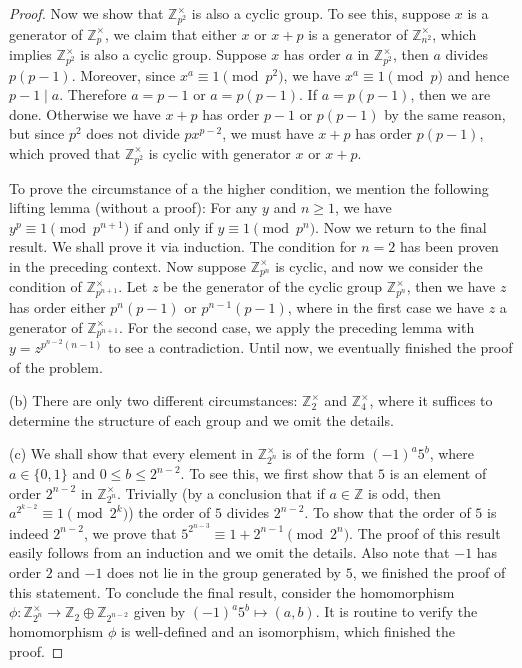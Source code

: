 \begin{proof}
Now we show that $\mathbb{Z}_{p^2}^\times$ is also a cyclic group. To see this, suppose $x$ is a generator of $\mathbb{Z}_p^\times$, we claim that either $x$ or $x+p$ is a generator of $\mathbb{Z}_{n^2}^\times$, which implies $\mathbb{Z}_{p^2}^\times$ is also a cyclic group. Suppose $x$ has order $a$ in $\mathbb{Z}_{p^2}^\times$, then $a$ divides $p(p-1)$. Moreover, since $x^a\equiv 1\pmod{p^2}$, we have $x^a\equiv 1\pmod{p}$ and hence $p-1\mid a$. Therefore $a=p-1$ or $a=p(p-1)$. If $a=p(p-1)$, then we are done. Otherwise we have $x+p$ has order $p-1$ or $p(p-1)$ by the same reason, but since $p^2$ does not divide $px^{p-2}$, we must have $x+p$ has order $p(p-1)$, which proved that $\mathbb{Z}_{p^2}^\times$ is cyclic with generator $x$ or $x+p$.\par
To prove the circumstance of a the higher condition, we mention the following lifting lemma (without a proof): For any $y$ and $n\ge 1$, we have $y^p\equiv 1\pmod{p^{n+1}}$ if and only if $y\equiv 1\pmod{p^n}$. Now we return to the final result. We shall prove it via induction. The condition for $n=2$ has been proven in the preceding context. Now suppose $\mathbb{Z}_{p^n}^\times$ is cyclic, and now we consider the condition of $\mathbb{Z}_{p^{n+1}}^\times$. Let $z$ be the generator of the cyclic group $\mathbb{Z}_{p^n}^\times$, then we have $z$ has order either $p^n(p-1)$ or $p^{n-1}(p-1)$, where in the first case we have $z$ a generator of $\mathbb{Z}_{p^{n+1}}^\times$. For the second case, we apply the preceding lemma with $y=z^{p^{n-2}(n-1)}$ to see a contradiction. Until now, we eventually finished the proof of the problem.\par
(b) There are only two different circumstances: $\mathbb{Z}_2^\times$ and $\mathbb{Z}_4^\times$, where it suffices to determine the structure of each group and we omit the details.\par
(c) We shall show that every element in $\mathbb{Z}_{2^n}^\times$ is of the form $(-1)^a5^b$, where $a\in\{0,1\}$ and $0\le b\le 2^{n-2}$. To see this, we first show that $5$ is an element of order $2^{n-2}$ in $\mathbb{Z}_{2^n}^\times$. Trivially (by a conclusion that if $a\in\mathbb{Z}$ is odd, then $a^{2^{k-2}}\equiv 1\pmod{2^k}$) the order of $5$ divides $2^{n-2}$. To show that the order of $5$ is indeed $2^{n-2}$, we prove that $5^{2^{n-3}}\equiv 1+2^{n-1}\pmod{2^n}$. The proof of this result easily follows from an induction and we omit the details. Also note that $-1$ has order $2$ and $-1$ does not lie in the group generated by $5$, we finished the proof of this statement. To conclude the final result, consider the homomorphism $\phi:\mathbb{Z}_{2^n}^\times\to\mathbb{Z}_2\oplus\mathbb{Z}_{2^{n-2}}$ given by $(-1)^a5^b\mapsto (a,b)$. It is routine to verify the homomorphism $\phi$ is well-defined and an isomorphism, which finished the proof.
\end{proof}
